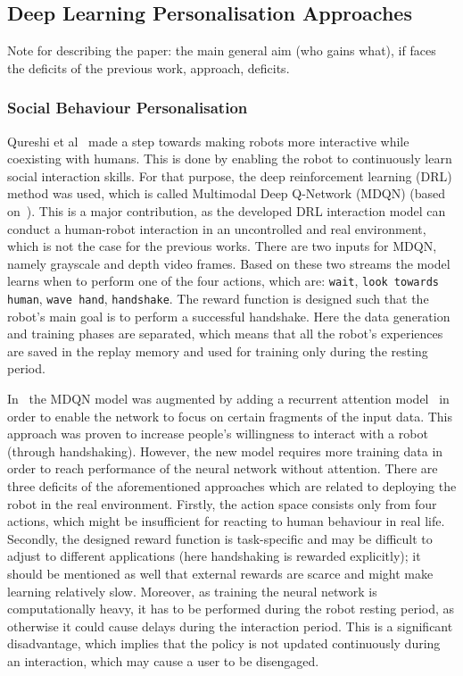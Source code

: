 \documentclass[thesis]{mas_proposal}
\begin{document}
\subsection{Deep Learning Personalisation Approaches}

{\color{red}Note for describing the paper: the main general aim (who gains what), if faces the deficits of the previous work, approach, deficits.}

\subsubsection{Social Behaviour Personalisation}
Qureshi et al~\cite{Qureshi2016} made a step towards making robots more interactive while coexisting with humans. This is done by enabling the robot to continuously learn social interaction skills. For that purpose, the deep reinforcement learning (DRL) method was used, which is called Multimodal Deep Q-Network (MDQN) (based on~\cite{mnih2015human}). This is a major contribution, as the developed DRL interaction model can conduct a human-robot interaction in an uncontrolled and real environment, which is not the case for the previous works. There are two inputs for MDQN, namely grayscale and depth video frames. Based on these two streams the model learns when to perform one of the four actions, which are: \texttt{wait}, \texttt{look towards human}, \texttt{wave hand}, \texttt{handshake}. The reward function is designed such that the robot's main goal is to perform a successful handshake. Here the data generation and training phases are separated, which means that all the robot's experiences are saved in the replay memory and used for training only during the resting period. 

In~\cite{Qureshi2017} the MDQN model was augmented by adding a recurrent attention model~\cite{sorokin2015deep} in order to enable the network to focus on certain fragments of the input data. This approach was proven to increase people's willingness to interact with a robot (through handshaking). However, the new model requires more training data in order to reach performance of the neural network without attention. There are three deficits of the aforementioned approaches which are related to deploying the robot in the real environment. Firstly, the action space consists only from four actions, which might be insufficient for reacting to human behaviour in real life. Secondly, the designed reward function is task-specific and may be difficult to adjust to different applications (here handshaking is rewarded explicitly); it should be mentioned as well that external rewards are scarce and might make learning relatively slow. Moreover, as training the neural network is computationally heavy, it has to be performed during the robot resting period, as otherwise it could cause delays during the interaction period. This is a significant disadvantage, which implies that the policy is not updated continuously during an interaction, which may cause a user to be disengaged. 
\end{document}
